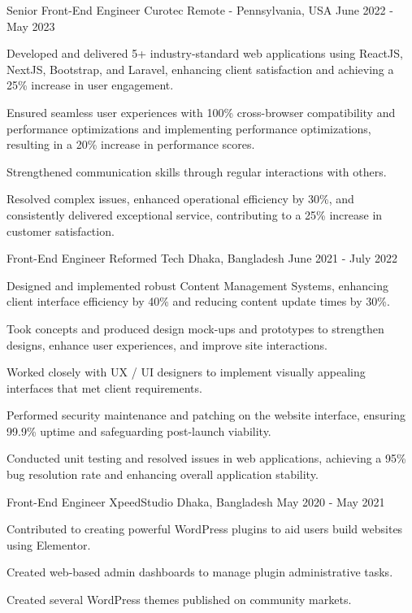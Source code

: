 \begin{cventries}
  \cventry
    {Senior Front-End Engineer} %
    {Curotec} %
    {Remote - Pennsylvania, USA} %
    {June 2022 - May 2023} %
    {
      \begin{cvitems} %
        \item {Developed and delivered 5+ industry-standard web applications using ReactJS, NextJS, Bootstrap, and Laravel, enhancing client satisfaction and achieving a 25\% increase in user engagement.}
        \item {Ensured seamless user experiences with 100\% cross-browser compatibility and performance optimizations and implementing performance optimizations, resulting in a 20\% increase in performance scores.}
        \item {Strengthened communication skills through regular interactions with others.}
        \item {Resolved complex issues, enhanced operational efficiency by 30\%, and consistently delivered exceptional service, contributing to a 25\% increase in customer satisfaction.}
      \end{cvitems}
    }


    \cventry
        {Front-End Engineer}
        {Reformed Tech}
        {Dhaka, Bangladesh}
        {June 2021 - July 2022}
        {
            \begin{cvitems}
                \item {Designed and implemented robust Content Management Systems, enhancing client interface efficiency by 40\% and reducing content update times by 30\%.}
                \item {Took concepts and produced design mock-ups and prototypes to strengthen designs, enhance user experiences, and improve site interactions.}
                \item {Worked closely with UX / UI designers to implement visually appealing interfaces that met client requirements.}
                \item {Performed security maintenance and patching on the website interface, ensuring 99.9\% uptime and safeguarding post-launch viability.}
                \item {Conducted unit testing and resolved issues in web applications, achieving a 95\% bug resolution rate and enhancing overall application stability.}
            \end{cvitems}
        }


    \cventry
        {Front-End Engineer}
        {XpeedStudio}
        {Dhaka, Bangladesh}
        {May 2020 - May 2021}
        {
            \begin{cvitems}
                \item {Contributed to creating powerful WordPress plugins to aid users build websites using Elementor.}
                \item {Created web-based admin dashboards to manage plugin administrative tasks.}
                \item {Created several WordPress themes published on community markets.}
            \end{cvitems}
        }



\end{cventries}
